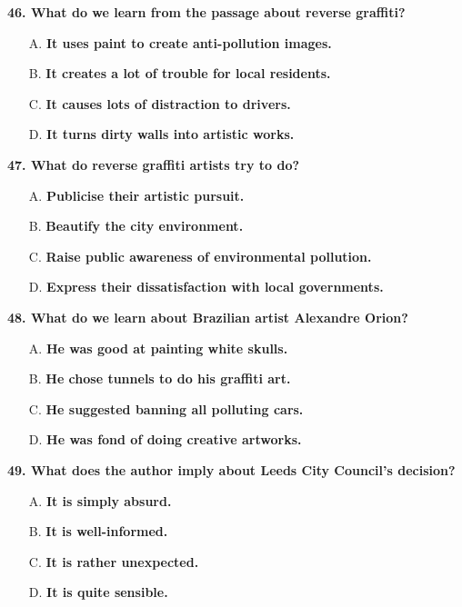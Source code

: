 \documentclass[UTF8,11pt]{ctexart}
\begin{document}
\textbf{46. What do we learn from the passage about reverse graffiti?}


\begin{itemize}[leftmargin=2em,itemsep=.2em,topsep=.4em]\item[A.] \textbf{It uses paint to create anti-pollution images.}
\item[B.] \textbf{It creates a lot of trouble for local residents.}
\item[C.] \textbf{It causes lots of distraction to drivers.}
\item[D.] \textbf{It turns dirty walls into artistic works.}
\end{itemize}

\textbf{47. What do reverse graffiti artists try to do?}


\begin{itemize}[leftmargin=2em,itemsep=.2em,topsep=.4em]\item[A.] \textbf{Publicise their artistic pursuit.}
\item[B.] \textbf{Beautify the city environment.}
\item[C.] \textbf{Raise public awareness of environmental pollution.}
\item[D.] \textbf{Express their dissatisfaction with local governments.}
\end{itemize}

\textbf{48. What do we learn about Brazilian artist Alexandre Orion?}


\begin{itemize}[leftmargin=2em,itemsep=.2em,topsep=.4em]\item[A.] \textbf{He was good at painting white skulls.}
\item[B.] \textbf{He chose tunnels to do his graffiti art.}
\item[C.] \textbf{He suggested banning all polluting cars.}
\item[D.] \textbf{He was fond of doing creative artworks.}
\end{itemize}

\textbf{49. What does the author imply about Leeds City Council's decision?}


\begin{itemize}[leftmargin=2em,itemsep=.2em,topsep=.4em]\item[A.] \textbf{It is simply absurd.}
\item[B.] \textbf{It is well-informed.}
\item[C.] \textbf{It is rather unexpected.}
\item[D.] \textbf{It is quite sensible.}
\end{itemize}
\end{document}
